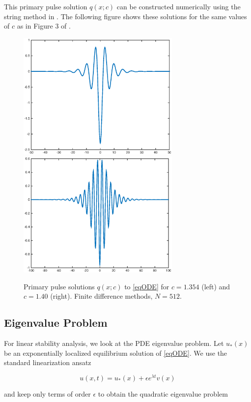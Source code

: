 \documentclass[12pt]{article}
\begin{document}
This primary pulse solution $q(x; c)$ can be constructed numerically using the string method in \cite{Chamard2011}. The following figure shows these solutions for the same values of $c$ as in Figure 3 of \cite{Chen1997}.

\begin{figure}[H]
\centering
\includegraphics[width=8cm]{single1354.eps}
\includegraphics[width=8cm]{single14.eps}
\label{fig:single1}
\caption{Primary pulse solutions $q(x;c)$ to \eqref{eqODE} for $c = 1.354$ (left) and $c = 1.40$ (right). Finite difference methods, $N = 512$.}
\end{figure}

\subsection{Eigenvalue Problem}

For linear stability analysis, we look at the PDE eigenvalue problem. Let $u_*(x)$ be an exponentially localized equilibrium solution of \eqref{eqODE}. We use the standard linearization ansatz

\begin{equation}
u(x,t) = u_*(x) + \epsilon e^{\lambda t} v(x)
\end{equation}

and keep only terms of order $\epsilon$ to obtain the quadratic eigenvalue problem
\end{document}
